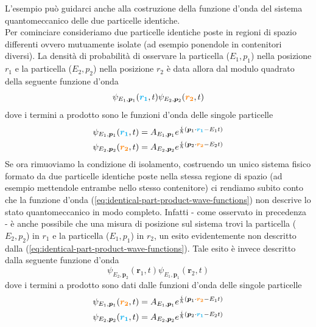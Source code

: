 L'esempio può guidarci anche alla costruzione della funzione d'onda del
sistema quantomeccanico delle due particelle identiche.\\
Per cominciare consideriamo due particelle identiche poste in regioni di
spazio differenti ovvero mutuamente isolate (ad esempio ponendole in
contenitori diversi).
La densità di probabilità di osservare la
particella (\(E_{1},p_{1}\)) nella posizione \(r_{1}\) e la particella
(\(E_{2},p_{2}\)) nella posizione \(r_{2}\) è data allora dal modulo
quadrato della seguente funzione d'onda
\begin{equation}
    \psi_{E_{1},\bm{p}_{1}}(\textcolor{cyan}{\bm{r_1}},t) \psi_{E_{2},\bm{p}_{2}}(\textcolor{orange}{\bm{r_2}},t)
    \label{eq:identical-part-product-wave-functions}
\end{equation}
dove i termini a prodotto sono le funzioni d'onda delle singole
particelle \begin{gather*}
               \psi_{E_{1},\bm{p}_{1}}(\textcolor{cyan}{\bm{r_1}},t) = A_{E_{1},\bm{p}_{1}}e^{ \frac{i}{\hbar} (\bm{p}_{1} \cdot \textcolor{cyan}{\bm{r_1}}-E_{1}t)}\\
               \psi_{E_{2},\bm{p}_{2}}(\textcolor{orange}{\bm{r_2}},t) = A_{E_{2},\bm{p}_{2}}e^{ \frac{i}{\hbar} (\bm{p}_{2} \cdot \textcolor{orange}{\bm{r_2}}-E_{2}t)}
\end{gather*}
Se ora rimuoviamo la condizione di isolamento, costruendo un unico
sistema fisico formato da due particelle identiche poste nella stessa
regione di spazio (ad esempio mettendole entrambe nello stesso
contenitore) ci rendiamo subito conto che la funzione d'onda (\ref{eq:identical-part-product-wave-functions})
non descrive lo stato quantomeccanico in modo completo.
Infatti - come
osservato in precedenza - è anche possibile che una misura di posizione
sul sistema trovi la particella (\(E_{2},p_{2}\)) in \(r_{1}\) e la
particella (\(E_{1},p_{1}\)) in \(r_{2}\), un esito evidentemente non
descritto dalla (\ref{eq:identical-part-product-wave-functions}).
Tale esito è invece descritto dalla seguente funzione d'onda
\begin{equation}
    \psi_{E_{2},\bm{p}_{2}}(\bm{r}_{1},t) \psi_{E_{1},\bm{p}_{1}}(\bm{r}_{2},t)
    \label{eq:identical-part-product-wave-functions-2}
\end{equation} dove i termini a prodotto sono dati dalle funzioni d'onda
delle singole particelle
\begin{gather*}
    \psi_{E_{1},\bm{p}_{1}}(\textcolor{orange}{\bm{r_2}},t) = A_{E_{1},\bm{p}_{1}}e^{ \frac{i}{\hbar} (\bm{p}_{1} \cdot \textcolor{orange}{\bm{r_2}}-E_{1}t)}\\
    \psi_{E_{2},\bm{p}_{2}}(\textcolor{cyan}{\bm{r_1}},t) = A_{E_{2},\bm{p}_{2}}e^{ \frac{i}{\hbar} (\bm{p}_{2} \cdot \textcolor{cyan}{\bm{r_1}}-E_{2}t)}
\end{gather*}
